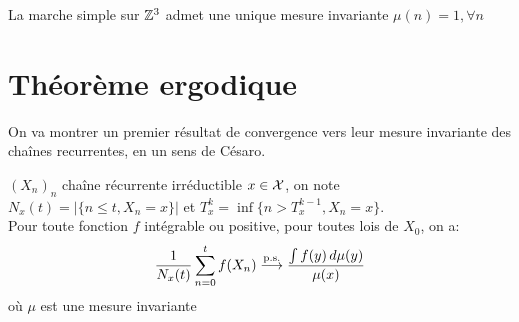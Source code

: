 \documentclass[]{report}
\begin{document}
    \begin{re}{}{}
        La marche simple sur $\mathbb{Z}^3$ admet une unique mesure invariante $\mu(n)=1,\forall n$
    \end{re}

    \section{Théorème ergodique}

    On va montrer un premier résultat de convergence vers leur mesure invariante des chaînes recurrentes, en un sens de Césaro.

    \begin{prop}{}{}
        $(X_n)_n$ chaîne récurrente irréductible $x\in \mathcal{X}$, on note $N_x(t)=|\{n\le t,X_n=x\}|$ et $T_x^{k}=\inf \{n>T_x^{k-1},X_n=x\}$.\\
        Pour toute fonction $f$ intégrable ou positive, pour toutes lois de $X_0$, on a:
        \[\frac{1}{N_x(t)}\sum_{n=0}^{t} f(X_n)\overset{\text{p.s.}}{\longrightarrow} \frac{\int f(y)\, d\mu(y)}{\mu(x)}\]
        où $\mu$ est une mesure invariante
    \end{prop}
\end{document}
